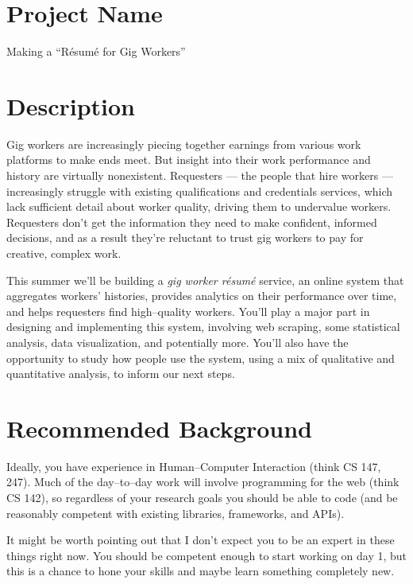 \documentclass[12pt]{article}
\begin{document}
\section{Project Name}

Making a ``R\'{e}sum\'{e} for Gig Workers''

\section{Description}

Gig workers are increasingly
piecing together earnings from various work platforms to make ends meet.
But insight into their work performance and history
are virtually nonexistent.
Requesters
--- the people that hire workers ---
increasingly struggle with existing qualifications and credentials services,
which lack sufficient detail about worker quality, driving them to undervalue workers.
Requesters don't get the information they need to make confident, informed decisions, and
as a result they're reluctant to trust gig workers to pay for creative, complex work.

This summer we'll be building a \textit{gig worker r\'{e}sum\'{e}} service,
an online system that aggregates
workers' histories, provides analytics on their performance over time, and helps requesters find high--quality workers.
You'll play a major part in designing and implementing this system,
involving web scraping, some statistical analysis, data visualization, and potentially more.
You'll also have the opportunity to study how people use the system,
using a mix of qualitative and quantitative analysis,
to inform our next steps.


\section{Recommended Background}\label{sec:RecommendedBackground}

Ideally, you have experience in
Human--Computer Interaction
(think CS 147, 247).
Much of the day--to--day work will involve programming for the web
(think CS 142),
so regardless of your research goals you should be able to code
(and be reasonably competent with existing libraries, frameworks, and APIs).

It might be worth pointing out that
I don't expect you to be an expert in these things right now.
You should be competent enough to start working on day 1, but
this is a chance to hone your skills and maybe learn something completely new.
\end{document}

